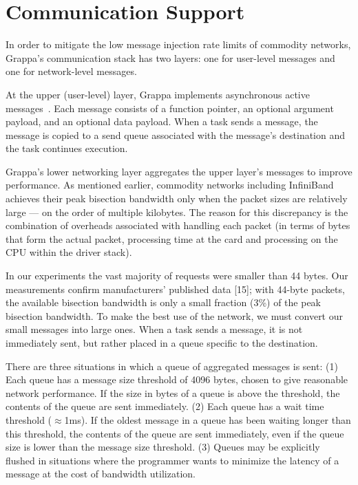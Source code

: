 \section{Communication Support}
\label{sec:communication}

In order to mitigate the low message injection rate limits of commodity
networks, Grappa's communication stack has two layers: one for user-level
messages and one for network-level messages.

At the upper (user-level) layer, Grappa implements asynchronous active
messages~\cite{vonEicken92}. Each message consists of a function pointer, an
optional argument payload, and an optional data payload. When a task sends a
message, the message is copied to a send queue associated with the message's
destination and the task continues execution.

Grappa’s lower networking layer aggregates the upper layer’s messages to
improve performance. As mentioned earlier, commodity networks including
InfiniBand achieves their peak bisection bandwidth only when the packet sizes
are relatively large --- on the order of multiple kilobytes. The reason for
this discrepancy is the combination of overheads associated with handling each
packet (in terms of bytes that form the actual packet, processing time at the
card and processing on the CPU within the driver stack).

In our experiments the vast majority of requests were smaller than 44 bytes.
Our measurements confirm manufacturers' published data [15]; with 44-byte
packets, the available bisection bandwidth is only a small fraction (3\%) of
the peak bisection bandwidth. To make the best use of the network, we must
convert our small messages into large ones. When a task sends a message, it is
not immediately sent, but rather placed in a queue specific to the
destination.

There are three situations in which a queue of aggregated messages is sent:
(1) Each queue has a message size threshold of 4096 bytes, chosen to give
reasonable network performance. If the size in bytes of a queue is above the
threshold, the contents of the queue are sent immediately. (2) Each queue
has a wait time threshold ($\approx${1ms}). If the oldest message in a queue
has been waiting longer than this threshold, the contents of the queue are
sent immediately, even if the queue size is lower than the message size
threshold. (3) Queues may be explicitly flushed in situations where the
programmer wants to minimize the latency of a message at the cost of bandwidth
utilization.

